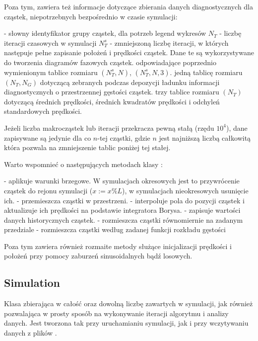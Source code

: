 Poza tym, zawiera też informacje dotyczące zbierania danych diagnostycznych
dla cząstek, niepotrzebnych bezpośrednio w czasie symulacji:
\begin{itemize}
    \itemi {} - słowny identyfikator grupy cząstek, dla potrzeb legend wykresów
    \itemi $N_T$ - liczbę iteracji czasowych w symulacji
    \itemi $N_T^s$ - zmniejszoną liczbę iteracji, w których następuje pełne
        zapisanie położeń i prędkości cząstek.  Dane te są wykorzystywane
        do tworzenia diagramów fazowych cząstek.
    \itemi odpowiadające poprzednio wymienionym tablice rozmiaru $(N_T^s,
        N)$, $(N_T^s, N, 3)$. 
    \itemi jedną tablicę rozmiaru $(N_T, N_G)$ dotyczącą zebranych podczas
        depozycji ładunku informacji diagnostycznych o przestrzennej gęstości cząstek.
    \itemi trzy tablice rozmiaru $(N_T)$ dotyczącą średnich prędkości,
        średnich kwadratów prędkości i odchyleń standardowych prędkości.
\end{itemize}

Jeżeli liczba makrocząstek lub iteracji przekracza pewną stałą (rzędu $10^4$), dane zapisywane są jedynie dla co $n$-tej cząstki,
gdzie $n$ jest najniższą liczbą całkowitą która pozwala na zmniejszenie tablic poniżej tej stałej.

Warto wspomnieć o następujących metodach klasy :
\begin{itemize}
    \itemi {} - aplikuje warunki brzegowe. W symulacjach okresowych jest to przywrócenie cząstek do rejonu symulacji ($x := x \% L$), w symulacjach nieokresowych usunięcie ich.
    \itemi {}  - przemieszcza cząstki w przestrzeni.
    \itemi {} - interpoluje pola do pozycji cząstek i aktualizuje ich prędkości na podstawie integratora Borysa.
    \itemi {} - zapisuje wartości danych historycznych cząstek.
    \itemi {} - rozmieszcza cząstki równomiernie na zadanym przedziale
    \itemi {} - rozmieszcza cząstki według zadanej funkcji rozkładu gęstości
\end{itemize}

Poza tym  zawiera również rozmaite metody służące inicjalizacji
prędkości i położeń przy pomocy zaburzeń sinusoidalnych bądź losowych.

\subsection{Simulation}
Klasa zbierająca w całość  oraz dowolną liczbę  zawartych w
symulacji, jak również pozwalająca w prosty sposób na wykonywanie iteracji
algorytmu i analizy danych. Jest tworzona tak przy uruchamianiu symulacji,
jak i przy wczytywaniu danych z plików .

